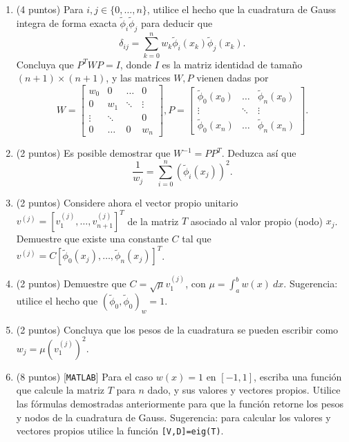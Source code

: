 \documentclass[12pt,final,twoside,notitlepage]{article}
\begin{document}
\begin{enumerate}
\begin{enumerate}
\item (4 puntos) Para $i,j\in \{0,\ldots, n\}$, utilice el hecho que la cuadratura de Gauss integra de forma exacta $\widetilde{\phi}_i\widetilde{\phi}_j$ para deducir que $$\delta_{ij} = \sum_{k=0}^n w_k \widetilde{\phi}_i(x_k)\widetilde{\phi}_j(x_k).$$ Concluya que $P^T W P  = I$, donde $I$ es la matriz identidad de tamaño $(n+1)\times (n+1)$, y las matrices $W, P$ vienen dadas por
\begin{equation*} \label{eq:T}
W = \left[
\begin{array}{cccc}
w_0 &  0 & \ldots  & 0   \\ 
0 & w_1 &  \ddots & \vdots \\ 
\vdots & \ddots&  &0  \\ 
0  & \ldots & 0 & w_n 
\end{array} 
\right], 
P = \left[
\begin{array}{ccc}
\widetilde{\phi}_0(x_0) &  \ldots  & \widetilde{\phi}_n(x_0)   \\ 
\vdots & \ddots & \vdots \\ 
\widetilde{\phi}_0(x_n)  & \ldots  &\widetilde{\phi}_n(x_n) 
\end{array} 
\right].
\end{equation*}

\item (2 puntos) Es posible demostrar que $W^{-1} = PP^T$. Deduzca así que $$\frac{1}{w_j} = \displaystyle \sum_{i=0}^n (\widetilde{\phi}_i(x_j))^2.$$

\item (2 puntos) Considere ahora el vector propio unitario $v^{(j)} = [v_1^{(j)},\ldots,v_{n+1}^{(j)}]^T$ de la matriz $T$ asociado al valor propio (nodo) $x_j$. Demuestre que existe una constante $C$ tal que $v^{(j)} = C[\widetilde{\phi}_0(x_j),\ldots,\widetilde{\phi}_{n}(x_j)]^T$.

\item (2 puntos) Demuestre que $C=\sqrt{\mu} v_1^{(j)}$, con $\mu = \int_a^b w(x)\ dx$. Sugerencia: utilice el hecho que $(\widetilde{\phi}_0,\widetilde{\phi}_0)_w=1$.

\item (2 puntos)  Concluya que los pesos de la cuadratura se pueden escribir como $w_j = \mu (v_1^{(j)})^2$.

\item (8 puntos) [\texttt{MATLAB}] Para el caso $w(x)=1$ en $[-1,1]$, escriba una función que calcule la matriz $T$ para $n$ dado, y sus valores y vectores propios. Utilice las fórmulas demostradas anteriormente para que la función retorne los pesos y nodos de la cuadratura de Gauss. Sugerencia: para calcular los valores y vectores propios utilice la función \texttt{[V,D]=eig(T)}.


\end{enumerate}
\end{enumerate}
\end{document}
